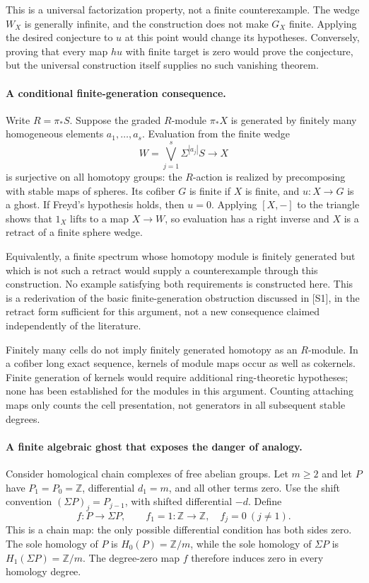 \documentclass[11pt]{article}
\begin{document}
This is a universal factorization property, not a finite counterexample.
The wedge $W_X$ is generally infinite, and the construction does not
make $G_X$ finite. Applying the desired conjecture to $u$ at this point
would change its hypotheses. Conversely, proving that every map $hu$
with finite target is zero would prove the conjecture, but the universal
construction itself supplies no such vanishing theorem.

\paragraph{A conditional finite-generation consequence.}
Write $R=\pi_*S$. Suppose the graded $R$-module $\pi_*X$ is generated
by finitely many homogeneous elements $a_1,\ldots,a_s$. Evaluation from
the finite wedge
\[
                  W=\bigvee_{j=1}^s\Sigma^{|a_j|}S\longrightarrow X
\]
is surjective on all homotopy groups: the $R$-action is realized by
precomposing with stable maps of spheres. Its cofiber $G$ is finite if
$X$ is finite, and $u:X\to G$ is a ghost. If Freyd's hypothesis holds,
then $u=0$. Applying $[X,-]$ to the triangle shows that $1_X$ lifts to
a map $X\to W$, so evaluation has a right inverse and $X$ is a retract
of a finite sphere wedge.

Equivalently, a finite spectrum whose homotopy module is finitely
generated but which is not such a retract would supply a counterexample
through this construction. No example satisfying both requirements is
constructed here. This is a rederivation of the basic finite-generation
obstruction discussed in [S1], in the retract form sufficient for this
argument, not a new consequence claimed independently of the literature.

Finitely many cells do not imply finitely generated homotopy as an
$R$-module. In a cofiber long exact sequence, kernels of module maps
occur as well as cokernels. Finite generation of kernels would require
additional ring-theoretic hypotheses; none has been established for the
modules in this argument. Counting attaching maps only counts the cell
presentation, not generators in all subsequent stable degrees.

\paragraph{A finite algebraic ghost that exposes the danger of analogy.}
Consider homological chain complexes of free abelian groups. Let $m\ge2$
and let $P$ have $P_1=P_0=\mathbb Z$, differential $d_1=m$, and all
other terms zero. Use the shift convention
$(\Sigma P)_j=P_{j-1}$, with shifted differential $-d$. Define
\[
              f:P\longrightarrow\Sigma P,
              \qquad f_1=1:\mathbb Z\to\mathbb Z,
              \quad f_j=0\ (j\ne1).
\]
This is a chain map: the only possible differential condition has both
sides zero. The sole homology of $P$ is $H_0(P)=\mathbb Z/m$, while
the sole homology of $\Sigma P$ is $H_1(\Sigma P)=\mathbb Z/m$.
The degree-zero map $f$ therefore induces zero in every homology degree.
\end{document}
